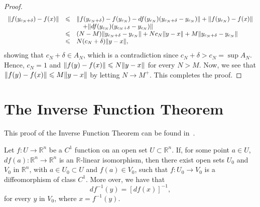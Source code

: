 \begin{proof}
	\[
		\begin{array}{rcl}
			\lVert f(y_{c_{N}+\delta})-f(x)\rVert
			 & \leqslant &
			\lVert f(y_{c_{N}+\delta})-f(y_{c_{N}})-df(y_{c_{N}})(y_{c_{N}+\delta}-y_{c_{N}})\rVert
			+
			\lVert f(y_{c_{N}})-f(x)\rVert
			\\
			 &           & \quad
			+
			\lVert df(y_{c_{N}})(y_{c_{N}+\delta}-y_{c_{N}})\rVert
			\\
			 & \leqslant &
			(N-M)\lVert y_{c_{N}+\delta}-y_{c_{N}}\rVert
			+
			Nc_{N}\lVert y-x\rVert
			+
			M\lVert y_{c_{N}+\delta}-y_{c_{N}}\rVert
			\\
			 & \leqslant &
			N(c_{N}+\delta)\lVert y-x\rVert,
		\end{array}
	\]
	showing that \({c_{N}+\delta}\in{A_{N}}\), which is a contradiction since
	\(c_{N}+\delta>c_{N}=\sup{A_{N}}\). Hence, \(c_{N}=1\) and
	\(\lVert f(y)-f(x)\rVert\leqslant{N\lVert y-x\rVert}\) for every \(N>M\). Now, we see that
	\(\lVert f(y)-f(x)\rVert\leqslant{M\lVert y-x\rVert}\) by letting \({N}\to{M^{+}}\). This
	completes the proof.
\end{proof}

\section{The Inverse Function Theorem}\label{sec:the_inverse_function_theorem}

This proof of the Inverse Function Theorem can be found in~\cite{lang1993}.

\begin{theorem}\label{thm:the-inverse-function-theorem}
	Let \(f:U\to\mathbb{R}^{n}\) be a \(C^{1}\) function on an open set
	\({U}\subset{\mathbb{R}^{n}}\). If, for some point \({a}\in{U}\),
	\(df(a):\mathbb{R}^{n}\to\mathbb{R}^{n}\) is an \(\mathbb{R}\)-linear
	isomorphism, then there exist open sets \(U_{0}\) and \(V_{0}\) in
	\(\mathbb{R}^{n}\), with \({a}\in{U_{0}}\subset{U}\) and \({f(a)}\in{V_{0}}\),
	such that \(f:U_{0}\to{V_{0}}\) is a diffeomorphism of class \(C^{1}\). More
	over, we have that
	\[
		df^{-1}(y)=[df(x)]^{-1},
	\]
	for every \(y\) in \(V_{0}\), where \(x=f^{-1}(y)\).
\end{theorem}

